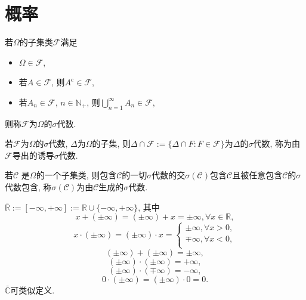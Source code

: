 \chapter{概率}

\begin{definition}
    若$\Omega$的子集类$\mathcal{F}$满足\begin{itemize}
        \item $\Omega\in\mathcal{F}$,
        \item 若$A\in\mathcal{F}$, 则$A^\text{c}\in\mathcal{F}$,
        \item 若$A_n\in\mathcal{F}$, $n\in \mathbb{N}_+$, 则$\bigcup_{n=1}^{\infty}A_n\in\mathcal{F}$,
    \end{itemize}则称$\mathcal{F}$为$\Omega$的$\sigma$代数.
\end{definition}

\begin{definition}
    若$\mathcal{F}$为$\Omega$的$\sigma$代数, $\Delta$为$\Omega$的子集, 则$\Delta\cap\mathcal{F}:=\{\Delta\cap F:F\in\mathcal{F}\}$为$\Delta$的$\sigma$代数, 称为由$\mathcal{F}$导出的诱导$\sigma$代数.
\end{definition}

\begin{definition}
    若$\mathcal{C}$ 是$\Omega$的一个子集类, 则包含$\mathcal{C}$的一切$\sigma$代数的交$\sigma(\mathcal{C})$包含$\mathcal{C}$且被任意包含$\mathcal{C}$的$\sigma$代数包含, 称$\sigma(\mathcal{C})$为由$\mathcal{C}$生成的$\sigma$代数.
\end{definition}

\begin{definition}
    $\bar{\mathbb{R} }:=[-\infty,+\infty]:=\mathbb{R}\cup\{-\infty,+\infty\}$, 其中\begin{equation*}
        x+(\pm\infty)=(\pm\infty)+x=\pm\infty, \forall x\in\mathbb{R},
    \end{equation*}\begin{equation*}
        x\cdot(\pm\infty)=(\pm\infty)\cdot x=\begin{cases}
            \pm\infty,\forall x>0,\\
            \mp\infty,\forall x<0,\\
        \end{cases}
    \end{equation*}\begin{equation*}
        (\pm\infty)+(\pm\infty)=\pm\infty,
    \end{equation*}\begin{equation*}
        (\pm\infty)\cdot(\pm\infty)=+\infty,
    \end{equation*}\begin{equation*}
        (\pm\infty)\cdot(\mp\infty)=-\infty,
    \end{equation*}\begin{equation*}
        0\cdot(\pm\infty)=(\pm\infty)\cdot0=0.
    \end{equation*}$\bar{\mathbb{C} }$可类似定义.
\end{definition}

